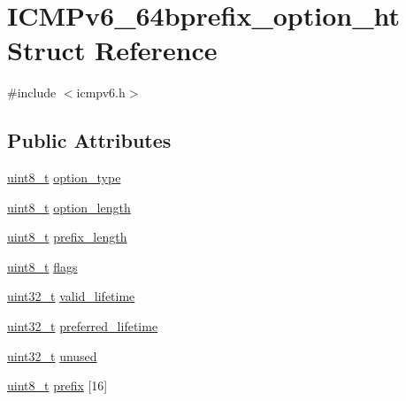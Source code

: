 \hypertarget{struct_i_c_m_pv6__64bprefix__option__ht}{}\section{I\+C\+M\+Pv6\+\_\+64bprefix\+\_\+option\+\_\+ht Struct Reference}
\label{struct_i_c_m_pv6__64bprefix__option__ht}


{\ttfamily \#include $<$icmpv6.\+h$>$}

\subsection*{Public Attributes}
\begin{DoxyCompactItemize}
\item 
\hyperlink{_p_e___types_8h_aba7bc1797add20fe3efdf37ced1182c5}{uint8\+\_\+t} \hyperlink{struct_i_c_m_pv6__64bprefix__option__ht_a2247ee15a8ee3173110a048bc4c9c349}{option\+\_\+type}
\item 
\hyperlink{_p_e___types_8h_aba7bc1797add20fe3efdf37ced1182c5}{uint8\+\_\+t} \hyperlink{struct_i_c_m_pv6__64bprefix__option__ht_aaf23b7df5b1e489006cdb6adfb7ac0bb}{option\+\_\+length}
\item 
\hyperlink{_p_e___types_8h_aba7bc1797add20fe3efdf37ced1182c5}{uint8\+\_\+t} \hyperlink{struct_i_c_m_pv6__64bprefix__option__ht_abb655630f357ac9cd6d674bc4d6dc83f}{prefix\+\_\+length}
\item 
\hyperlink{_p_e___types_8h_aba7bc1797add20fe3efdf37ced1182c5}{uint8\+\_\+t} \hyperlink{struct_i_c_m_pv6__64bprefix__option__ht_ad6c56f01b88015ef644ac3b32d766444}{flags}
\item 
\hyperlink{_p_e___types_8h_a33594304e786b158f3fb30289278f5af}{uint32\+\_\+t} \hyperlink{struct_i_c_m_pv6__64bprefix__option__ht_ace2e33732ecb35fe7d5f4ca099d299cc}{valid\+\_\+lifetime}
\item 
\hyperlink{_p_e___types_8h_a33594304e786b158f3fb30289278f5af}{uint32\+\_\+t} \hyperlink{struct_i_c_m_pv6__64bprefix__option__ht_af30f582bc6e39f0d0c15833b17e9d487}{preferred\+\_\+lifetime}
\item 
\hyperlink{_p_e___types_8h_a33594304e786b158f3fb30289278f5af}{uint32\+\_\+t} \hyperlink{struct_i_c_m_pv6__64bprefix__option__ht_aeaa3213b1bfa575299a1b8ac1de40834}{unused}
\item 
\hyperlink{_p_e___types_8h_aba7bc1797add20fe3efdf37ced1182c5}{uint8\+\_\+t} \hyperlink{struct_i_c_m_pv6__64bprefix__option__ht_ae5ac170dcaca6ab835ed3e4d42da68ae}{prefix} \mbox{[}16\mbox{]}
\end{DoxyCompactItemize}


